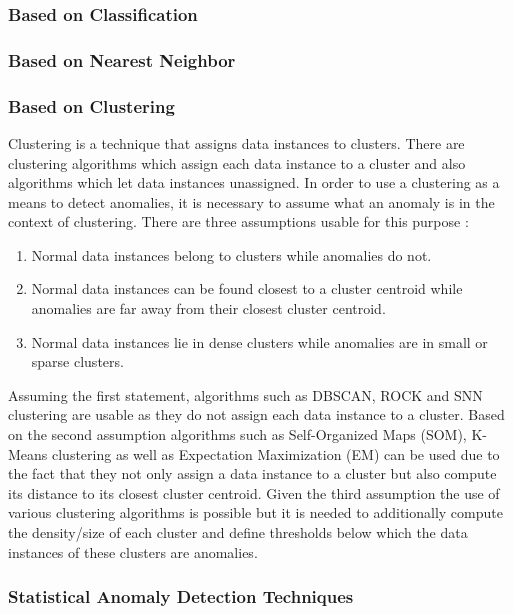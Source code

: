 \documentclass{dima}
\begin{document}
\subsubsection{Based on Classification}

\subsubsection{Based on Nearest Neighbor}

\subsubsection{Based on Clustering}
\label{sec:BoClus}

Clustering is a technique that assigns data instances to clusters. There are clustering algorithms which assign each data instance to a cluster and also algorithms which let data instances unassigned. In order to use a clustering as a means to detect anomalies, it is necessary to assume what an anomaly is in the context of clustering. There are three assumptions usable for this purpose \cite{Chandola:2009:ADS:1541880.1541882}:
\begin{enumerate}
\item Normal data instances belong to clusters while anomalies do not.
\item Normal data instances can be found closest to a cluster centroid while anomalies are far away from their closest cluster centroid.
\item Normal data instances lie in dense clusters while anomalies are in small or sparse clusters.
\end{enumerate}
Assuming the first statement, algorithms such as DBSCAN, ROCK and SNN clustering are usable as they do not assign each data instance to a cluster. Based on the second assumption algorithms such as Self-Organized Maps (SOM), K-Means clustering as well as Expectation Maximization (EM) can be used due to the fact that they not only assign a data instance to a cluster but also compute its distance to its closest cluster centroid. Given the third assumption the use of various clustering algorithms is possible but it is needed to additionally compute the density/size of each cluster and define thresholds below which the data instances of these clusters are anomalies.

\subsubsection{Statistical Anomaly Detection Techniques}
\end{document}
